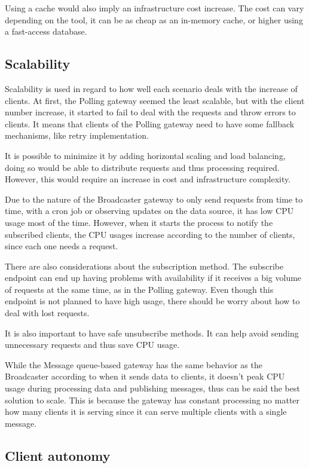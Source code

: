 Using a cache would also imply an infrastructure cost increase. The cost can vary depending on the tool, it can be as cheap as an in-memory cache, or higher using a fast-access database.

\subsection*{Scalability}
\label{sec:scala}

Scalability is used in regard to how well each scenario deals with the increase of clients. At first, the Polling gateway seemed the least scalable, but with the client number increase, it started to fail to deal with the requests and throw errors to clients. It means that clients of the Polling gateway need to have some fallback mechanisms, like retry implementation.

It is possible to minimize it by adding horizontal scaling and load balancing, doing so would be able to distribute requests and thus processing required. However, this would require an increase in cost and infrastructure complexity.

Due to the nature of the Broadcaster gateway to only send requests from time to time, with a cron job or observing updates on the data source, it has low CPU usage most of the time. However, when it starts the process to notify the subscribed clients, the CPU usages increase according to the number of clients, since each one needs a request.

There are also considerations about the subscription method. The subscribe endpoint can end up having problems with availability if it receives a big volume of requests at the same time, as in the Polling gateway. Even though this endpoint is not planned to have high usage, there should be worry about how to deal with lost requests.

It is also important to have safe unsubscribe methods. It can help avoid sending unnecessary requests and thus save CPU usage.

While the Message queue-based gateway has the same behavior as the Broadcaster according to when it sends data to clients, it doesn't peak CPU usage during processing data and publishing messages, thus can be said the best solution to scale. This is because the gateway has constant processing no matter how many clients it is serving since it can serve multiple clients with a single message.

\subsection*{Client autonomy}
\label{sec:client}

